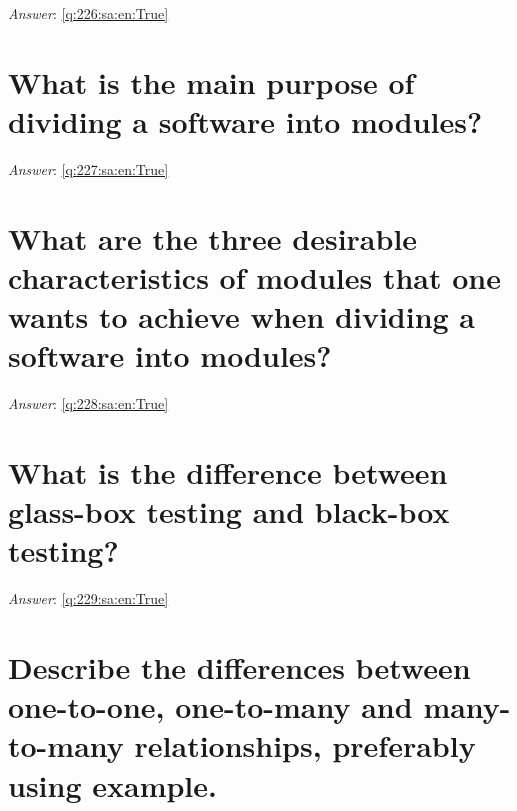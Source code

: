 \documentclass[a4paper,11pt,oneside]{book}
\begin{document}
\begin{sloppypar}
\noindent\makebox[\textwidth]{\hrulefill}

\vspace{1cm}

\textit{Answer}: \autoref{q:226:sa:en:True}



\section{What is the main purpose of dividing a software into modules?}

\label{q:227:sa:en:False}

\vspace{2cm}

\noindent\makebox[\textwidth]{\hrulefill}

\vspace{1cm}

\textit{Answer}: \autoref{q:227:sa:en:True}



\section{What are the three desirable characteristics of modules that one wants to achieve when dividing a software into modules?}

\label{q:228:sa:en:False}

\vspace{2cm}

\noindent\makebox[\textwidth]{\hrulefill}

\vspace{1cm}

\textit{Answer}: \autoref{q:228:sa:en:True}



\section{What is the difference between glass-box testing and black-box testing?}

\label{q:229:sa:en:False}

\vspace{2cm}

\noindent\makebox[\textwidth]{\hrulefill}

\vspace{1cm}

\textit{Answer}: \autoref{q:229:sa:en:True}



\section{Describe the differences between one-to-one, one-to-many and many-to-many relationships, preferably using example.}


\end{sloppypar}
\end{document}
